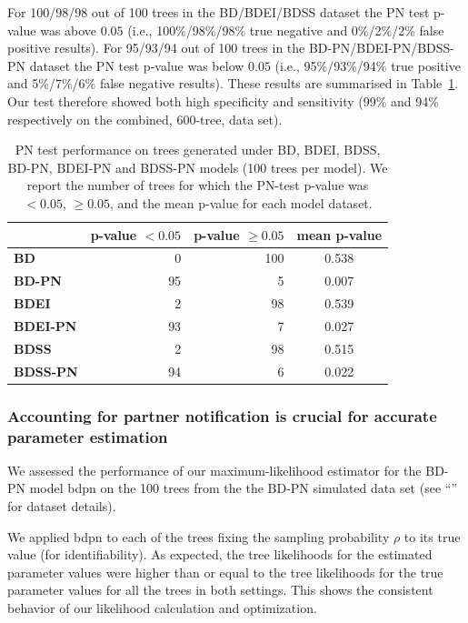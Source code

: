 \documentclass[10pt,letterpaper]{article}
\begin{document}
For 100/98/98 out of 100 trees in the BD/BDEI/BDSS dataset the PN test p-value was above $0.05$ (i.e., 100\%/98\%/98\% true negative and 0\%/2\%/2\% false positive results). For 95/93/94 out of 100 trees in the BD-PN/BDEI-PN/BDSS-PN dataset the PN test p-value was below $0.05$ (i.e., 95\%/93\%/94\% true positive and 5\%/7\%/6\% false negative results). These results are summarised in Table~\ref{tbl:pntest}. Our test therefore showed both high specificity and sensitivity (99\% and 94\% respectively on the combined, 600-tree, data set).

\begin{table}[!h]\centering
\small
\caption{PN test performance on trees generated under BD, BDEI, BDSS, BD-PN, BDEI-PN and BDSS-PN models (100 trees per model). We report the number of trees for which the PN-test p-value was $<0.05$, $\geq 0.05$, and the mean p-value for each model dataset.}
\begin{tabular}{l|r|r|c}
 & \textbf{p-value $<0.05$} & \textbf{p-value $\geq0.05$} & \textbf{mean p-value} \\
  \midrule
\textbf{BD}& 0 & 100 & 0.538 \\
\textbf{BD-PN}& 95 & 5 & 0.007 \\
  \midrule
\textbf{BDEI}& 2 & 98 & 0.539 \\
\textbf{BDEI-PN}& 93 & 7 & 0.027 \\
  \midrule
\textbf{BDSS}& 2 & 98 & 0.515 \\
\textbf{BDSS-PN}& 94 & 6 & 0.022 \\
\end{tabular}
\label{tbl:pntest}
\end{table}

\subsubsection*{Accounting for partner notification is crucial for accurate parameter estimation}

We assessed the performance of our maximum-likelihood estimator for the BD-PN model bdpn on the 100 trees from the the BD-PN simulated data set (see ``'' for dataset details).

We applied bdpn to each of the trees fixing the sampling probability $\rho$ to its true value (for identifiability). %
As expected, the tree likelihoods for the estimated parameter values were higher than or equal to the tree likelihoods for the true parameter values for all the trees in both settings. This shows the consistent behavior of our likelihood calculation and optimization.
\end{document}
